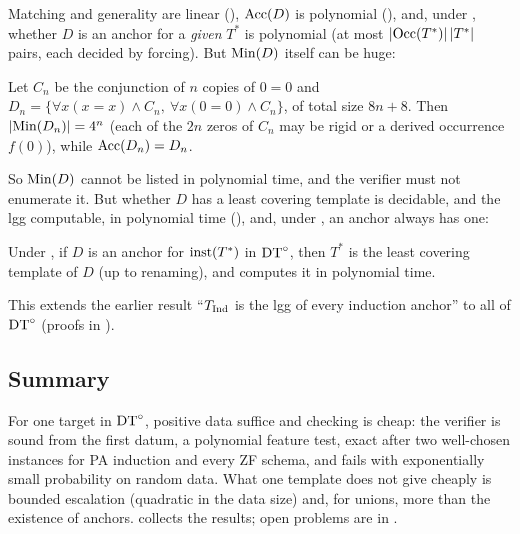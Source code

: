 Matching and generality are linear (), $\mathrm{Acc}(D)$ is polynomial (), and, under \Rich, whether $D$ is an anchor for a \emph{given} $T^*$ is polynomial (at most $|\mathrm{Occ}(T^*)|\,|T^*|$ pairs, each decided by forcing). But $\mathrm{Min}(D)$ itself can be huge:

\begin{proposition}\label{prop:single:blowup}
Let $C_n$ be the conjunction of $n$ copies of $0=0$ and $D_n=\{\forall x(x=x)\wedge C_n,\ \forall x(0=0)\wedge C_n\}$, of total size $8n+8$. Then $|\mathrm{Min}(D_n)|=4^n$ (each of the $2n$ zeros of $C_n$ may be rigid or a derived occurrence $f(0)$), while $\mathrm{Acc}(D_n)=D_n$.
\end{proposition}

\noindent So $\mathrm{Min}(D)$ cannot be listed in polynomial time, and the verifier must not enumerate it. But whether $D$ has a least covering template is decidable, and the lgg computable, in polynomial time (), and, under \Rich, an anchor always has one:

\begin{corollary}\label{cor:single:anchor-lgg}
Under \Rich, if $D$ is an anchor for $\mathrm{inst}(T^*)$ in $\mathrm{DT}^{\circ}$, then $T^*$ is the least covering template of $D$ (up to renaming), and  computes it in polynomial time.
\end{corollary}

\noindent This extends the earlier result ``$T_{\mathrm{Ind}}$ is the lgg of every induction anchor'' to all of $\mathrm{DT}^{\circ}$ (proofs in ).

\subsection{Summary}\label{sec:single:summary}

For one target in $\mathrm{DT}^{\circ}$, positive data suffice and checking is cheap: the verifier is sound from the first datum, a polynomial feature test, exact after two well-chosen instances for PA induction and every ZF schema, and fails with exponentially small probability on random data. What one template does not give cheaply is bounded escalation (quadratic in the data size) and, for unions, more than the existence of anchors.  collects the results; open problems are in .


